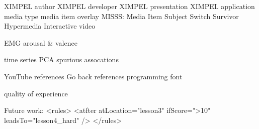 XIMPEL author
XIMPEL developer
XIMPEL presentation
XIMPEL application
media type
media item
overlay
MISSS: Media Item Subject Switch Survivor
Hypermedia
Interactive video

EMG
arousal & valence

time series
PCA
spurious assocations

YouTube references
Go back references
programming font

quality of experience

Future work:
<rules>
    <atfter atLocation="lesson3" ifScore=">10" leadsTo="lesson4_hard" />
</rules>